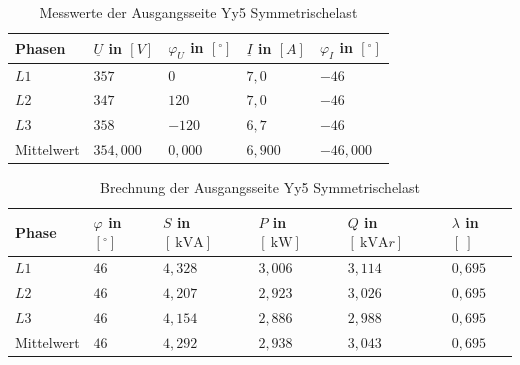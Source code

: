 \begin{enumerate}[label=\alph*)]
	      \begin{table}[h!]
		      \centering
		      \caption{Messwerte der Ausgangsseite Yy5 Symmetrischelast}
		      \begin{tabular}{lllll}
			      \\ \hline
			      Phasen     & $\underline{U}$ in $[V]$ & $\varphi_{U}$ in $[^\circ]$ & $\underline{I}$ in $[A]$ & $\varphi_{I}$ in $[^\circ]$ \\ \hline
			      $L1$       & $357$                    & $0$                         & $7,0$                    & $-46$                       \\
			      $L2$       & $347$                    & $120$                       & $7,0$                    & $-46$                       \\
			      $L3$       & $358$                    & $-120$                      & $6,7$                    & $-46$                       \\ \hline
			      Mittelwert & $354,000$                & $0,000$                     & $6,900$                  & $-46,000$                   \\ \hline\hline
		      \end{tabular}
	      \end{table}

	      \begin{table}[h!]
		      \centering
		      \caption{Brechnung der Ausgangsseite Yy5 Symmetrischelast}
		      \begin{tabular}{llllll}
			      \\ \hline
			      Phase      & $\varphi$ in $[^\circ]$ & $S$ in $[\SI{}{\kilo\volt\ampere}]$ & $P$ in $[\SI{}{\kilo\watt}]$ & $Q$ in $[\SI{}{\kilo\volt\ampere r}]$ & $\lambda$ in $[\ ]$ \\ \hline
			      $L1$       & $46$                    & $4,328$                             & $3,006$                      & $3,114$                               & $0,695$             \\
			      $L2$       & $46$                    & $4,207$                             & $2,923$                      & $3,026$                               & $0,695$             \\
			      $L3$       & $46$                    & $4,154$                             & $2,886$                      & $2,988$                               & $0,695$             \\ \hline
			      Mittelwert & $46$                    & $4,292$                             & $2,938$                      & $3,043$                               & $0,695$             \\ \hline\hline
		      \end{tabular}
	      \end{table}


\end{enumerate}

